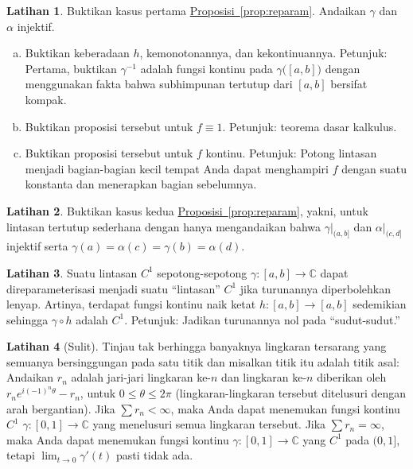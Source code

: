 \documentclass[12pt,openany]{book}
\newcommand{\C}{{\mathbb{C}}}
\newcommand{\myquote}[1]{``#1''}
\theoremstyle{plain}
\theoremstyle{remark}
\theoremstyle{definition}
\newenvironment{exbox}{%
    \def\FrameCommand{\vrule width 1pt \relax\hspace{10pt}}%
    \MakeFramed{\advance\hsize-\width\FrameRestore}%
}{%
    \endMakeFramed
}
\newenvironment{exparts}{%
    \leavevmode\begin{enumerate}[a),noitemsep,topsep=0pt,parsep=0pt,partopsep=0pt]
}{%
    \end{enumerate}
}
\theoremstyle{exercise}
\newtheorem{exercise}{Latihan}[section]
\theoremstyle{example}
\newcommand{\propref}[1]{\hyperref[#1]{Proposisi~\ref*{#1}}}
\begin{document}
\begin{exbox}
\begin{exercise}
Buktikan kasus pertama \propref{prop:reparam}.
Andaikan $\gamma$ dan $\alpha$ injektif.
\begin{exparts}
\item
Buktikan keberadaan $h$, kemonotonannya, dan kekontinuannya.
Petunjuk: Pertama, buktikan $\gamma^{-1}$ adalah fungsi kontinu pada
$\gamma\bigl([a,b]\bigr)$ dengan menggunakan fakta bahwa subhimpunan tertutup dari $[a,b]$
bersifat kompak.
\item
Buktikan proposisi tersebut untuk $f\equiv 1$.
Petunjuk: teorema dasar kalkulus.
\item
Buktikan proposisi tersebut untuk $f$ kontinu.
Petunjuk: Potong lintasan menjadi bagian-bagian kecil tempat
Anda dapat menghampiri $f$ dengan suatu konstanta dan menerapkan
bagian sebelumnya.
\end{exparts}
\end{exercise}

\begin{exercise}
Buktikan kasus kedua \propref{prop:reparam}, yakni,
untuk lintasan tertutup sederhana dengan hanya mengandaikan bahwa $\gamma|_{(a,b]}$ dan
$\alpha|_{(c,d]}$ injektif serta
$\gamma(a)=\alpha(c)=\gamma(b)=\alpha(d)$.
\end{exercise}

\begin{exercise}
Suatu lintasan $C^1$ sepotong-sepotong $\gamma \colon [a,b] \to \C$
dapat direparameterisasi menjadi suatu \myquote{lintasan} $C^1$ jika turunannya
diperbolehkan lenyap.
Artinya, terdapat fungsi kontinu naik ketat
$h \colon [a,b] \to [a,b]$ sedemikian sehingga
$\gamma \circ h$ adalah $C^1$.
Petunjuk: Jadikan turunannya nol pada \myquote{sudut-sudut.}
\end{exercise}

\begin{exercise}[Sulit]
Tinjau tak berhingga banyaknya lingkaran tersarang yang semuanya bersinggungan pada satu titik
dan misalkan titik itu adalah titik asal: Andaikan $r_n$ adalah jari-jari
lingkaran ke-$n$
dan lingkaran ke-$n$ diberikan oleh $r_n e^{i(-1)^n\theta} - r_n$, untuk $0 \leq
\theta \leq 2\pi$ (lingkaran-lingkaran tersebut ditelusuri dengan arah bergantian).
Jika $\sum r_n < \infty$, maka Anda dapat menemukan fungsi kontinu
$C^1$ $\gamma \colon
[0,1] \to \C$ yang menelusuri semua lingkaran tersebut.  Jika $\sum r_n = \infty$, maka
Anda dapat menemukan fungsi kontinu $\gamma \colon [0,1] \to \C$ yang $C^1$ pada
$(0,1]$, tetapi $\lim_{t \to 0} \gamma'(t)$ pasti tidak ada.
\end{exercise}
\end{exbox}
\end{document}
